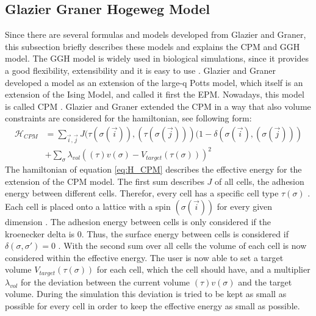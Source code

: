 \subsection{Glazier Graner Hogeweg Model} \label{subsec:Intro_GGH}
Since there are several formulas and models developed from Glazier and Graner, this subsection briefly describes these models and explains the \ac{CPM} and \ac{GGH} model.\newline
The \ac{GGH} model is widely used in biological simulations, since it provides a good flexibility, extensibility and it is easy to use \cite{Glazier2007}. 
Glazier and Graner developed a model as an extension of the large-q Potts model, which itself is an extension of the Ising Model, and called it first the \ac{EPM}. Nowadays, this model is called \ac{CPM} \cite{Glazier2007, Graner1992, Glazier1993}.
Glazier and Graner extended the \ac{CPM} in a way that also volume constraints are considered for the hamiltonian, see following form:
\begin{equation}\label{eq:H_CPM}
\begin{split}
\mathcal{H}_{CPM} & = \sum_{\vec{i},\vec{j}}^{ }J(\tau(\sigma(\vec{i})),(\tau(\sigma(\vec{j})))(1-\delta(\sigma(\vec{i}),(\sigma(\vec{j}))) \\
		 & + \sum_{\sigma}^{}{\lambda_{vol}((\tau)v(\sigma)-V_{target}(\tau(\sigma)))^2}
\end{split}
\end{equation}
The hamiltonian of equation \ref{eq:H_CPM} describes the effective energy for the extension of the \ac{CPM} model. The first sum describes $J$ of all cells, the adhesion energy between different cells. Therefor, every cell has a specific cell type $\tau(\sigma)$ \cite{Glazier1993, Graner1992}. Each cell is placed onto a lattice with a spin $(\sigma(\vec{i}))$ for every given dimension \cite{Graner1992, Glazier2007}. The adhesion energy between cells is only considered if the kroenecker delta is 0. Thus, the surface energy between cells is considered if $\delta(\sigma, \sigma') = 0$ \cite{Glazier1993, Graner1992, Stott1999, Glazier2007, Chen2007, Cickovski2005}. \newline
With the second sum over all cells the volume of each cell is now considered within the effective energy. The user is now able to set a target volume $V_{target}(\tau(\sigma))$ for each cell, which the cell should have, and a multiplier $\lambda_{vol}$ for the deviation between the current volume $(\tau)v(\sigma)$ and the target volume. During the simulation this deviation is tried to be kept as small as possible for every cell in order to keep the effective energy as small as possible.

